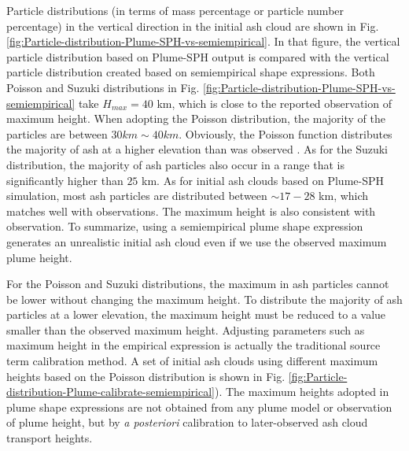 \documentclass[utf8]{frontiersSCNS} %
\begin{document}
Particle distributions (in terms of mass percentage or particle number percentage) in the vertical direction in the initial ash cloud are shown in Fig. \ref{fig:Particle-distribution-Plume-SPH-vs-semiempirical}. In that figure, the vertical particle distribution based on Plume-SPH output is compared with the vertical particle distribution created based on semiempirical shape expressions. Both Poisson and Suzuki distributions in Fig. \ref{fig:Particle-distribution-Plume-SPH-vs-semiempirical} take $H_{max} = 40$ km, which is close to the reported observation of maximum height. When adopting the Poisson distribution, the majority of the particles are between $30 km \sim 40 km$. Obviously, the Poisson function distributes the majority of ash at a higher elevation than was observed \citep[e.g.][]{fero2008simulation}. As for the Suzuki distribution, the majority of ash particles also occur in a range that is significantly higher than $25 $ km. As for initial ash clouds based on Plume-SPH simulation, most ash particles are distributed between $\sim 17-  28$ km, which matches well with observations. The maximum height is also consistent with observation. To summarize, using a semiempirical plume shape expression generates an unrealistic initial ash cloud even if we use the observed maximum plume height.

For the Poisson and Suzuki distributions, the maximum in ash particles cannot be lower without changing the maximum height. To distribute the majority of ash particles at a lower elevation, the maximum height must be reduced to a value smaller than the observed maximum height. Adjusting parameters such as maximum height in the empirical expression is actually the traditional source term calibration method. A set of initial ash clouds using different maximum heights based on the Poisson distribution is shown in Fig. \ref{fig:Particle-distribution-Plume-calibrate-semiempirical}). The maximum heights adopted in plume shape expressions are not obtained from any plume model or observation of plume height, but by \textit{a posteriori} calibration to later-observed ash cloud transport heights.
\end{document}
